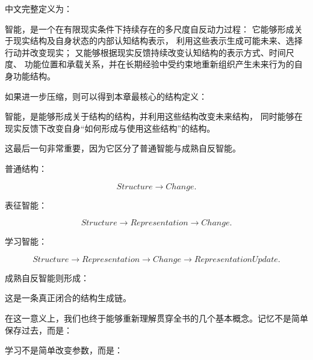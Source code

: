 中文完整定义为：

\begin{definition*}
智能，是一个在有限现实条件下持续存在的多尺度自反动力过程：
它能够形成关于现实结构及自身状态的内部认知结构表示，
利用这些表示生成可能未来、选择行动并改变现实；
又能够根据现实反馈持续改变认知结构的表示方式、时间尺度、
功能位置和承载关系，并在长期经验中受约束地重新组织产生未来行为的自身功能结构。
\end{definition*}

如果进一步压缩，则可以得到本章最核心的结构定义：

\begin{definition*}
智能，是能够形成关于结构的结构，并利用这些结构改变未来结构，
同时能够在现实反馈下改变自身“如何形成与使用这些结构”的结构。
\end{definition*}

这最后一句非常重要，因为它区分了普通智能与成熟自反智能。

普通结构：

\[
Structure
\rightarrow
Change.
\]

表征智能：

\[
Structure
\rightarrow
Representation
\rightarrow
Change.
\]

学习智能：

\[
Structure
\rightarrow
Representation
\rightarrow
Change
\rightarrow
RepresentationUpdate.
\]

成熟自反智能则形成：

\begin{statementbox}
\centering
{}
\end{statementbox}

这是一条真正闭合的结构生成链。

在这一意义上，我们也终于能够重新理解贯穿全书的几个基本概念。记忆不是简单保存过去，而是：

\begin{statementbox}
\centering
{}
\end{statementbox}

学习不是简单改变参数，而是：

\begin{statementbox}
\centering
{}
\end{statementbox}

